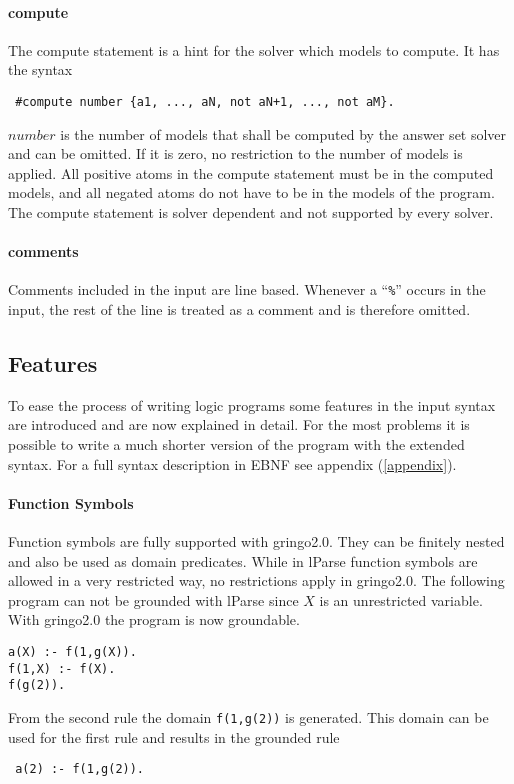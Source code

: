 \documentclass[a4paper,10pt]{article}
\begin{document}
\paragraph{compute}
The compute statement is a hint for the solver which models to compute.
It has the syntax
\begin{verbatim}
 #compute number {a1, ..., aN, not aN+1, ..., not aM}.
\end{verbatim}
$number$ is the number of models that shall be computed by the answer set solver and can be omitted. If it is zero, no restriction to the number of models is applied.
All positive atoms in the compute statement must be in the computed models, and all negated atoms do not have to be in the models of the program.
The compute statement is solver dependent and not supported by every solver.
\paragraph{comments}
Comments included in the input are line based.
Whenever a ``\texttt{\%}'' occurs in the input, the rest of the line is treated as a comment and is therefore omitted.



\subsection{Features}
To ease the process of writing logic programs some features in the input syntax are introduced and are now explained in detail.
For the most problems it is possible to write a much shorter version of the program with the extended syntax.
For a full syntax description in EBNF see appendix (\ref{appendix}).
\paragraph{Function Symbols}
Function symbols are fully supported with gringo2.0.
They can be finitely nested and also be used as domain predicates.
While in lParse function symbols are allowed in a very restricted way, no restrictions apply in gringo2.0.
The following program can not be grounded with lParse since $X$ is an unrestricted variable. With gringo2.0 the program is now groundable.
\begin{verbatim}
a(X) :- f(1,g(X)).
f(1,X) :- f(X).
f(g(2)).
\end{verbatim}
From the second rule the domain \texttt{f(1,g(2))} is generated.
This domain can be used for the first rule and results in the grounded rule
\begin{verbatim}
 a(2) :- f(1,g(2)).
\end{verbatim}
\end{document}
